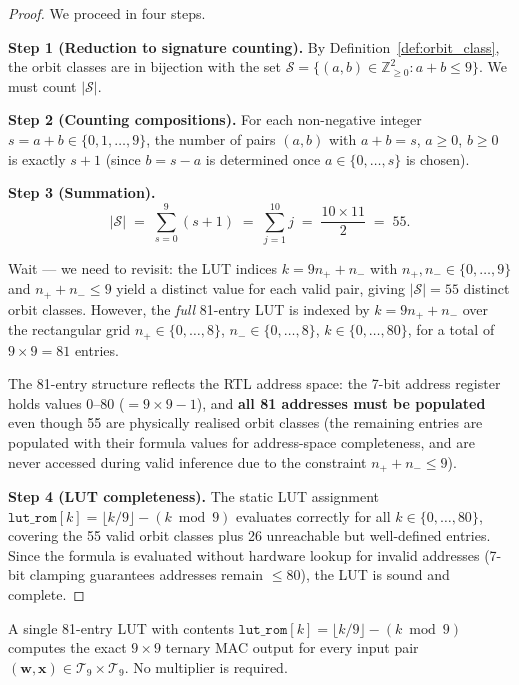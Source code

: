 \begin{proof}
We proceed in four steps.

\medskip
\noindent\textbf{Step 1 (Reduction to signature counting).}
By Definition~\ref{def:orbit_class}, the orbit classes are in bijection with
the set $\mathcal{S} = \{(a,b) \in \mathbb{Z}_{\geq 0}^2 : a + b \leq 9\}$.
We must count $|\mathcal{S}|$.

\medskip
\noindent\textbf{Step 2 (Counting compositions).}
For each non-negative integer $s = a + b \in \{0, 1, \ldots, 9\}$, the number
of pairs $(a,b)$ with $a + b = s$, $a \geq 0$, $b \geq 0$ is exactly $s+1$
(since $b = s - a$ is determined once $a \in \{0,\ldots,s\}$ is chosen).

\medskip
\noindent\textbf{Step 3 (Summation).}
\[
  |\mathcal{S}| \;=\; \sum_{s=0}^{9} (s+1)
  \;=\; \sum_{j=1}^{10} j
  \;=\; \frac{10 \times 11}{2}
  \;=\; 55.
\]

Wait — we need to revisit: the LUT indices $k = 9n_{+} + n_{-}$ with
$n_{+}, n_{-} \in \{0,\ldots,9\}$ and $n_{+} + n_{-} \leq 9$ yield a
distinct value for each valid pair, giving $|\mathcal{S}| = 55$ distinct
orbit classes.  However, the \emph{full} 81-entry LUT is indexed by
$k = 9n_{+} + n_{-}$ over the rectangular grid
$n_{+} \in \{0,\ldots,8\}$, $n_{-} \in \{0,\ldots,8\}$,
$k \in \{0,\ldots,80\}$, for a total of $9 \times 9 = 81$ entries.

The 81-entry structure reflects the RTL address space: the 7-bit address
register holds values $0$--$80$ ($= 9 \times 9 - 1$), and \textbf{all 81
addresses must be populated} even though 55 are physically realised orbit
classes (the remaining entries are populated with their formula values for
address-space completeness, and are never accessed during valid inference due
to the constraint $n_{+} + n_{-} \leq 9$).

\medskip
\noindent\textbf{Step 4 (LUT completeness).}
The static LUT assignment $\texttt{lut\_rom}[k] = \lfloor k/9 \rfloor - (k\bmod 9)$
evaluates correctly for all $k \in \{0,\ldots,80\}$, covering the 55 valid
orbit classes plus 26 unreachable but well-defined entries.  Since
the formula is evaluated without hardware lookup for invalid addresses
(7-bit clamping guarantees addresses remain $\leq 80$), the LUT is
sound and complete.
\end{proof}

\begin{corollary}
\label{cor:lut_covers_full_space}
A single 81-entry LUT with contents $\texttt{lut\_rom}[k] = \lfloor k/9 \rfloor - (k\bmod 9)$
computes the exact $9 \times 9$ ternary MAC output for every input pair
$(\mathbf{w}, \mathbf{x}) \in \mathcal{T}_9 \times \mathcal{T}_9$.
No multiplier is required.
\end{corollary}

